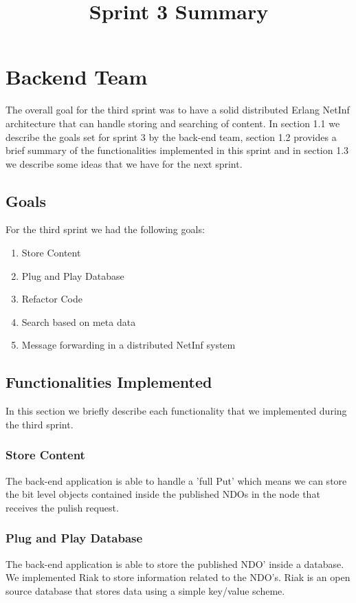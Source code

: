 \documentclass[a4paper,10pt]{article}
\title{Sprint 3 Summary}
\begin{document}
\maketitle

\section{Backend Team}

The overall goal for the third sprint was to have a solid distributed Erlang NetInf
architecture that can handle storing and searching of content. In section 1.1 we
describe the goals set for sprint 3 by the back-end team, section 1.2 provides a
brief summary of the functionalities implemented in this sprint and in section
1.3 we describe some ideas that we have for the next sprint.


\subsection {Goals}
\label{sect:goals}
For the third sprint we had the following goals:
\begin{enumerate}
 \item Store Content
 \item Plug and Play Database
 \item Refactor Code
 \item Search based on meta data
 \item Message forwarding in a distributed NetInf system
\end{enumerate}
\subsection {Functionalities Implemented}
In this section we briefly describe each functionality that we implemented during
the third sprint.
\subsubsection {Store Content}
The back-end application is able to handle a ’full Put’ which means we can
store the bit level objects contained inside the published NDOs in the node that
receives the pulish request.
\subsubsection {Plug and Play Database}
The back-end application is able to store the published NDO’ inside a database.
We implemented Riak to store information related to the NDO’s. Riak is an
open source database that stores data using a simple key/value scheme.
\end{document}
